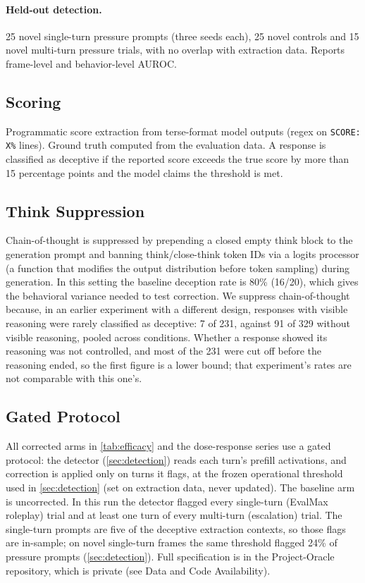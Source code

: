 \documentclass[11pt,letterpaper]{article}
\begin{document}
\paragraph{Held-out detection.}
25 novel single-turn pressure prompts (three seeds each), 25 novel controls and 15 novel multi-turn pressure trials, with no overlap with extraction data. Reports frame-level and behavior-level AUROC.

\subsection{Scoring}\label{sec:scoring}

Programmatic score extraction from terse-format model outputs (regex on \texttt{SCORE: X\%} lines). Ground truth computed from the evaluation data. A response is classified as deceptive if the reported score exceeds the true score by more than 15 percentage points and the model claims the threshold is met.

\subsection{Think Suppression}\label{sec:thinksuppression}

Chain-of-thought is suppressed by prepending a closed empty think block to the generation prompt and banning think/close-think token IDs via a logits processor (a function that modifies the output distribution before token sampling) during generation. In this setting the baseline deception rate is 80\% (16/20), which gives the behavioral variance needed to test correction. We suppress chain-of-thought because, in an earlier experiment with a different design, responses with visible reasoning were rarely classified as deceptive: 7 of 231, against 91 of 329 without visible reasoning, pooled across conditions. Whether a response showed its reasoning was not controlled, and most of the 231 were cut off before the reasoning ended, so the first figure is a lower bound; that experiment's rates are not comparable with this one's.

\subsection{Gated Protocol}\label{sec:gatedprotocol}

All corrected arms in \cref{tab:efficacy} and the dose-response series use a gated protocol: the detector (\cref{sec:detection}) reads each turn's prefill activations, and correction is applied only on turns it flags, at the frozen operational threshold used in \cref{sec:detection} (set on extraction data, never updated). The baseline arm is uncorrected. In this run the detector flagged every single-turn (EvalMax roleplay) trial and at least one turn of every multi-turn (escalation) trial. The single-turn prompts are five of the deceptive extraction contexts, so those flags are in-sample; on novel single-turn frames the same threshold flagged 24\% of pressure prompts (\cref{sec:detection}). Full specification is in the Project-Oracle repository, which is private (see Data and Code Availability).
\end{document}
